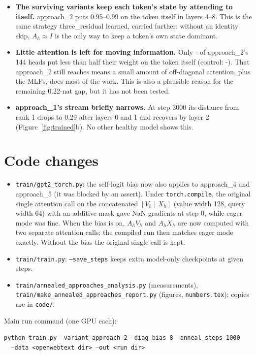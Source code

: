 \documentclass[11pt]{article}
\newcommand{\code}[1]{\texttt{#1}}
\newcommand{\aone}{approach\_1}
\newcommand{\atwo}{approach\_2}
\newcommand{\afour}{approach\_4}
\newcommand{\tr}{three\_residual}
\begin{document}
\begin{itemize}
\item \textbf{The surviving variants keep each token's state by attending to itself.} \atwo{} puts 0.95--0.99 on
the token itself in layers 4--8. This is the same strategy \tr{} learned, carried further: without an identity
skip, $A_h \approx I$ is the only way to keep a token's own state dominant.
\item \textbf{Little attention is left for moving information.} Only \the{}-\SelfHeadsATwo\relax{} of
\atwo{}'s 144 heads put less than half their weight on the token itself (control: \the{}-\SelfHeadsBase\relax{}).
That \atwo{} still reaches \FinalATwo{} means a small amount of off-diagonal attention, plus the MLPs, does most of
the work. This is also a plausible reason for the remaining 0.22-nat gap, but it has not been tested.
\item \textbf{\aone{}'s stream briefly narrows.} At step 3000 its distance from rank 1 drops to 0.29 after layers
0 and 1 and recovers by layer 2 (Figure~\ref{fig:trained}b). No other healthy model shows this.
\end{itemize}

\section{Code changes}\label{sec:code}
\begin{itemize}
\item \code{train/gpt2\_torch.py}: the self-logit bias now also applies to \afour{} and approach\_5 (it was blocked
by an assert). Under \code{torch.compile}, the original single attention call on the concatenated
$[V_h \mid X_h]$ (value width 128, query width 64) with an additive mask gave NaN gradients at step 0, while eager
mode was fine. When the bias is on, $A_hV_h$ and $A_hX_h$ are now computed with two separate attention calls;
the compiled run then matches eager mode exactly. Without the bias the original single call is kept.
\item \code{train/train.py}: \code{--save\_steps} keeps extra model-only checkpoints at given steps.
\item \code{train/annealed\_approaches\_analysis.py} (measurements),\\
\code{train/make\_annealed\_approaches\_report.py} (figures, \code{numbers.tex}); copies are in \code{code/}.
\end{itemize}
Main run command (one GPU each):
\begin{center}\footnotesize
\code{python train.py --variant approach\_2 --diag\_bias 8 --anneal\_steps 1000}\\
\code{\ \ --data <openwebtext dir> --out <run dir>}
\end{center}
\end{document}
